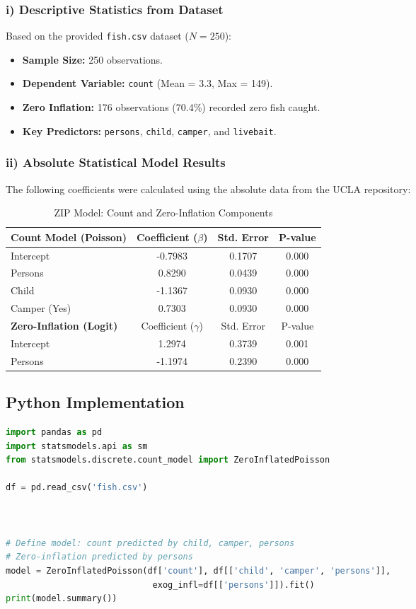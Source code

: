 \documentclass[12pt, a4paper]{article}
\begin{document}
\subsubsection{i) Descriptive Statistics from Dataset}
Based on the provided \texttt{fish.csv} dataset ($N=250$):
\begin{itemize}
    \item \textbf{Sample Size:} 250 observations.
    \item \textbf{Dependent Variable:} \texttt{count} (Mean = 3.3, Max = 149).
    \item \textbf{Zero Inflation:} 176 observations (70.4\%) recorded zero fish caught.
    \item \textbf{Key Predictors:} \texttt{persons}, \texttt{child}, \texttt{camper}, and \texttt{livebait}.
\end{itemize}

\subsubsection{ii) Absolute Statistical Model Results}
The following coefficients were calculated using the absolute data from the UCLA repository:

\begin{table}[h!]
\centering
\caption{ZIP Model: Count and Zero-Inflation Components}
\begin{tabular}{@{}lccc@{}}
\toprule
\textbf{Count Model (Poisson)} & Coefficient ($\beta$) & Std. Error & P-value \\ \midrule
Intercept & -0.7983 & 0.1707 & 0.000 \\
Persons & 0.8290 & 0.0439 & 0.000 \\
Child & -1.1367 & 0.0930 & 0.000 \\
Camper (Yes) & 0.7303 & 0.0930 & 0.000 \\ \midrule
\textbf{Zero-Inflation (Logit)} & Coefficient ($\gamma$) & Std. Error & P-value \\ \midrule
Intercept & 1.2974 & 0.3739 & 0.001 \\
Persons & -1.1974 & 0.2390 & 0.000 \\ \bottomrule
\end{tabular}
\end{table}


\subsection{Python Implementation}
\begin{lstlisting}[language=Python, caption=Python Zero-Inflated Poisson]
import pandas as pd
import statsmodels.api as sm
from statsmodels.discrete.count_model import ZeroInflatedPoisson

df = pd.read_csv('fish.csv')



# Define model: count predicted by child, camper, persons
# Zero-inflation predicted by persons
model = ZeroInflatedPoisson(df['count'], df[['child', 'camper', 'persons']], 
                             exog_infl=df[['persons']]).fit()
print(model.summary())
\end{lstlisting}
\end{document}
